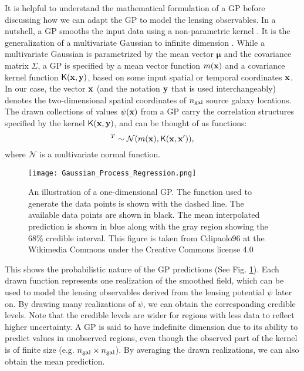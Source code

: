 It is helpful to understand the mathematical formulation of a GP 
before discussing how we can adapt the GP to model the lensing observables. 
In a nutshell, a GP smooths the input data using a non-parametric kernel
\citep{Hastie1990}. 
It is the generalization of a multivariate Gaussian 
to infinite dimension \citep{Rasmussen2006}. 
While a multivariate Gaussian is parametrized by  
the mean vector $\mathbf{\mu}$ and the covariance matrix $\Sigma$, 
a GP is specified by a mean vector function $m(\mathbf{x})$ and a
covariance kernel function $\mathsf{K}(\mathbf{x}, \mathbf{y})$, based on some input spatial or
temporal coordinates $\mathbf{x}$. In our case, the vector $\mathbf{x}$ (and the
 notation $\mathbf{y}$ that is used interchangeably) denotes the
two-dimensional spatial coordinates of $n_{\rm gal}$ source galaxy locations. 
The drawn collections of values $\psi(\mathbf{x})$ from a GP carry the correlation structures
specified by the kernel $\mathsf{K}(\mathbf{x}, \mathbf{y})$, and can be thought of as
functions: 
\begin{equation}
	[\psi_1(\xv), \psi_2(\xv) \ldots, \psi_m(\xv) ]^T \sim \mathcal{N}(m(\xv),
	\kerngp(\xv, \xv')),
		\label{eq:GP}
\end{equation}
where $\mathcal{N}$ is a multivariate normal function.
\begin{figure}
	\centering
	\texttt{[image: Gaussian\_Process\_Regression.png]}
	\caption{An illustration of a one-dimensional GP. The
		function used to generate the data points 
		is shown with the dashed line. The available data points are shown in
		black. The mean interpolated prediction is shown in blue
		along with the gray region showing the 68\% 
		credible interval. This figure is taken from Cdipaolo96 at 
		the Wikimedia Commons under the Creative Commons license 4.0
\label{fig:one_d_gaussian_process}}
\end{figure}
This shows the probabilistic nature of the GP predictions
(See Fig. \ref{fig:one_d_gaussian_process}).
Each drawn function represents one realization of the smoothed
field, which can be used to model the lensing observables derived 
from the lensing potential $\psi$ later on. 
By drawing many realizations of $\psi$, we can obtain the
corresponding credible levels.
Note that the credible levels are wider for regions with less data to reflect
higher uncertainty. A GP is said to have indefinite dimension due to its ability to
predict values in unobserved regions, even though the 
observed part of the kernel is of finite size (e.g. $n_{\rm gal} \times n_{\rm gal}$). 
By averaging the drawn realizations, we can also obtain the mean prediction. 

